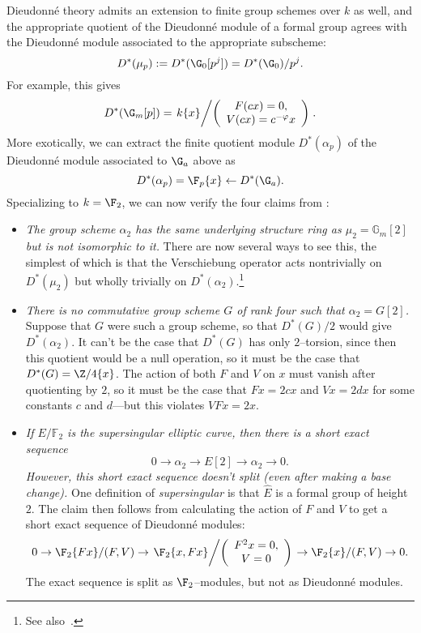 \begin{example}\label{WorkedAlpha2Example}
Dieudonn\'e theory admits an extension to finite group schemes over \(k\) as well, and the appropriate quotient of the Dieudonn\'e module of a formal group agrees with the Dieudonn\'e module associated to the appropriate subscheme: \[D^*(\mu_p) := D^*(\G_0[p^j]) = D^*(\G_0) / p^j.\]  For example, this gives \[D^*(\G_m[p]) = \left.k\{x\} \middle/\left(\begin{array}{c} F(cx) = 0, \\ V(cx) = c^{-\phi} x \end{array}\right)\right. .\]  More exotically, we can extract the finite quotient module \(D^*(\alpha_p)\) of the Dieudonn\'e module associated to \(\G_a\) above as \[D^*(\alpha_p) = \F_p\{x\} \leftarrow D^*(\G_a).\]  Specializing to $k = \F_2$, we can now verify the four claims from :
\begin{itemize}
\item \textit{The group scheme \(\alpha_2\) has the same underlying structure ring as \(\mu_2 = \mathbb{G}_m[2]\) but is not isomorphic to it.}  There are now several ways to see this, the simplest of which is that the Verschiebung operator acts nontrivially on \(D^*(\mu_2)\) but wholly trivially on \(D^*(\alpha_2)\).\footnote{See also~\cite[Example 8.5]{StricklandFPFP}.}
\item \textit{There is no commutative group scheme \(G\) of rank four such that \(\alpha_2 = G[2]\).}  Suppose that \(G\) were such a group scheme, so that \(D^*(G) / 2\) would give \(D^*(\alpha_2)\).  It can't be the case that \(D^*(G)\) has only \(2\)--torsion, since then this quotient would be a null operation, so it must be the case that \(D^*(G) = \Z/4\{x\}\).  The action of both \(F\) and \(V\) on \(x\) must vanish after quotienting by \(2\), so it must be the case that \(Fx = 2cx\) and \(Vx = 2dx\) for some constants \(c\) and \(d\)---but this violates \(VFx = 2x\).
\item \textit{If \(E/\mathbb{F}_2\) is the supersingular elliptic curve, then there is a short exact sequence \[0 \rightarrow \alpha_2 \rightarrow E[2] \rightarrow \alpha_2 \rightarrow 0.\]  However, this short exact sequence doesn't split (even after making a base change).}  One definition of \textit{supersingular} is that \(\widehat E\) is a formal group of height \(2\).  The claim then follows from calculating the action of \(F\) and \(V\) to get a short exact sequence of Dieudonn\'e modules: \[0 \to \F_2\{Fx\}/(F, V) \to \left.\F_2\{x, Fx\} \middle/ \left( \begin{array}{c} F^2x = 0, \\ V = 0 \end{array}\right) \right. \to \F_2\{x\}/(F, V) \to 0.\]  The exact sequence is split as \(\F_2\)--modules, but not as Dieudonn\'e modules.

\end{itemize}
\end{example}
